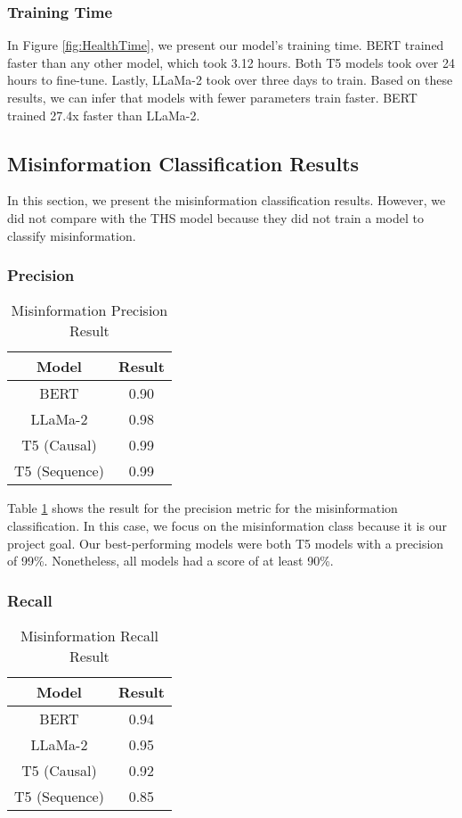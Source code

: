 \subsubsection{Training Time}

In Figure \ref{fig:HealthTime}, we present our model's training time. BERT trained faster than any other model, which took 3.12 hours. Both T5 models took over 24 hours to fine-tune. Lastly, LLaMa-2 took over three days to train. Based on these results, we can infer that models with fewer parameters train faster. BERT trained 27.4x faster than LLaMa-2.


\subsection{Misinformation Classification Results}
In this section, we present the misinformation classification results. However, we did not compare with the THS model because they did not train a model to classify misinformation.

\subsubsection{Precision}
\begin{table}[H]
	\centering
	\caption{Misinformation Precision Result}
	{\small
	\begin{tabular}{||c | c||} 
		\hline
		\textbf{Model} & \textbf{Result} \\ [0.5ex] 
		\hline
		BERT & 0.90  \\
		\hline
		LLaMa-2 & 0.98 \\ 
		\hline
		T5 (Causal) & 0.99 \\
		\hline
		T5 (Sequence) & 0.99 \\
		\hline
	\end{tabular}
	}
	\label{table:MisinformationPrecision}
\end{table}

Table \ref{table:MisinformationPrecision} shows the result for the precision metric for the misinformation classification. In this case, we focus on the misinformation
class because it is our project goal. Our best-performing models were both T5 models with a precision of 99\%. Nonetheless, all models had a score of at least 90\%.

\subsubsection{Recall}
\begin{table}[H]
	\centering
	\caption{Misinformation Recall Result}
	{\small
	\begin{tabular}{||c | c||} 
		\hline
		\textbf{Model} & \textbf{Result} \\ [0.5ex] 
		\hline
		BERT & 0.94  \\
		\hline
		LLaMa-2 & 0.95 \\ 
		\hline
		T5 (Causal) & 0.92 \\
		\hline
		T5 (Sequence) & 0.85 \\
		\hline
	\end{tabular}
	}
	\label{table:MisinformationRecall}
\end{table}

